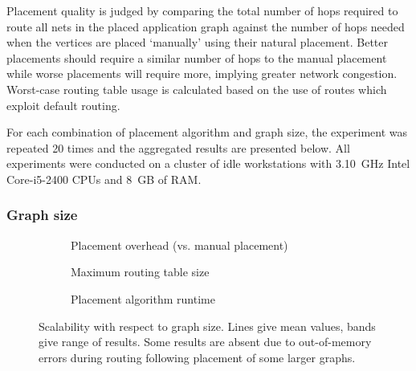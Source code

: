 			Placement quality is judged by comparing the total number of hops
			required to route all nets in the placed application graph against the
			number of hops needed when the vertices are placed `manually' using their
			natural placement. Better placements should require a similar number of
			hops to the manual placement while worse placements will require more,
			implying greater network congestion. Worst-case routing table usage is
			calculated based on the use of routes which exploit default routing.
			
			For each combination of placement algorithm and graph size, the
			experiment was repeated 20 times and the aggregated results are presented
			below. All experiments were conducted on a cluster of idle workstations
			with 3.10~GHz Intel Core-i5-2400 CPUs and 8~GB of RAM.
			
			\subsubsection{Graph size}
				
				\begin{figure}
					\center
					\begin{subfigure}{\linewidth}
						\center
						
						\caption{Placement overhead (vs. manual placement)}
						\label{fig:placement-scalability-size-quality}
					\end{subfigure}
					
					\vspace*{1em}
					
					\begin{subfigure}{\linewidth}
						\center
						
						\caption{Maximum routing table size}
						\label{fig:placement-scalability-size-entries}
					\end{subfigure}
					
					\vspace*{1em}
					
					\begin{subfigure}{\linewidth}
						\center
						
						\caption{Placement algorithm runtime}
						\label{fig:placement-scalability-size-runtime}
					\end{subfigure}
					
					\caption[Placer scalability with respect to graph size.]%
					{Scalability with respect to graph size. Lines give mean
					values, bands give range of results. Some results are absent due to
					out-of-memory errors during routing following placement of some
					larger graphs.}
					\label{fig:placement-scalability-size}
				\end{figure}
				
